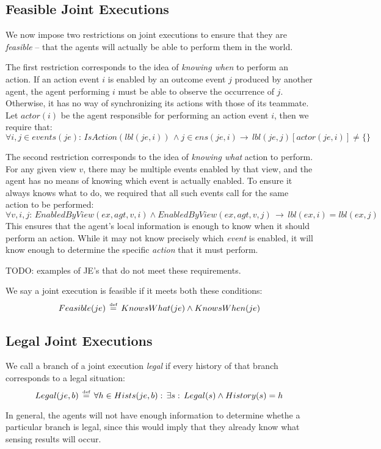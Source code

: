 \subsection{Feasible Joint Executions}

We now impose two restrictions on joint executions to ensure that
they are \emph{feasible} -- that the agents will actually be able
to perform them in the world.

The first restriction corresponds to the idea of \emph{knowing when}
to perform an action. If an action event $i$ is enabled by an outcome
event $j$ produced by another agent, the agent performing $i$ must
be able to observe the occurrence of $j$. Otherwise, it has no way
of synchronizing its actions with those of its teammate. Let $actor(i)$
be the agent responsible for performing an action event $i$, then
we require that:\[
\forall i,j\in events(je):\, IsAction(lbl(je,i))\,\wedge j\in ens(je,i)\rightarrow\, lbl(je,j)[actor(je,i)]\neq\{\}\]


The second restriction corresponds to the idea of \emph{knowing what}
action to perform. For any given view $v$, there may be multiple
events enabled by that view, and the agent has no means of knowing
which event is actually enabled. To ensure it always knows what to
do, we required that all such events call for the same action to be
performed:\[
\forall v,i,j:\, EnabledByView(ex,agt,v,i)\wedge EnabledByView(ex,agt,v,j)\,\rightarrow\, lbl(ex,i)=lbl(ex,j)\]
 This ensures that the agent's local information is enough to know
when it should perform an action. While it may not know precisely
which \emph{event} is enabled, it will know enough to determine the
specific \emph{action} that it must perform.

TODO: examples of JE's that do not meet these requirements.

We say a joint execution is feasible if it meets both these conditions:\[
Feasible(je)\,\stackrel{\mbox{\tiny def}}{=}\, KnowsWhat(je)\wedge KnowsWhen(je)\]



\subsection{Legal Joint Executions}

We call a branch of a joint execution \emph{legal} if every history
of that branch corresponds to a legal situation:\[
Legal(je,b)\,\stackrel{\mbox{\tiny def}}{=}\,\forall h\in Hists(je,b):\,\exists s:\, Legal(s)\wedge History(s)=h\]


In general, the agents will not have enough information to determine
whethe a particular branch is legal, since this would imply that they
already know what sensing results will occur.

